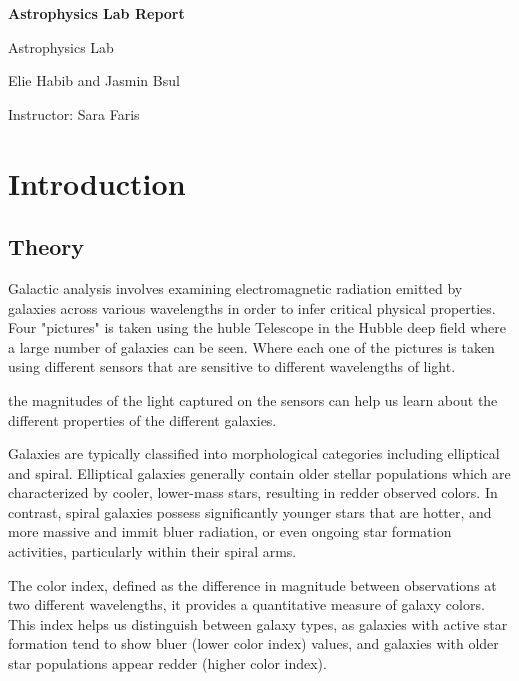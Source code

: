 \documentclass[11pt,a4paper]{article}
\newcommand{\reporttitle}{Astrophysics Lab Report}
\newcommand{\authorname}{Elie Habib and Jasmin Bsul}
\newcommand{\instructor}{Sara Faris}
\newcommand{\coursename}{Astrophysics Lab}
\begin{document}
\begin{titlepage}
  \centering
  \vspace*{1cm}
  {\Huge\bfseries \reporttitle \par}
  \vspace{1.5cm}
  {\Large\coursename \par}
  \vspace{2cm}
  {\Large\authorname \par}
  \vfill
  Instructor: \instructor\par
\end{titlepage}

\cleardoublepage
{}
\tableofcontents
\cleardoublepage
{}

\section{Introduction}
\subsection{Theory}
Galactic analysis involves examining electromagnetic radiation emitted by galaxies across various wavelengths in order to infer critical physical properties. 
Four "pictures" is taken using the huble Telescope in  the Hubble deep field where a large number of galaxies can be seen. Where each one of the pictures is taken using different sensors that are sensitive to different wavelengths of light. 

the magnitudes of the light captured on the sensors can help us learn about the different properties of the different galaxies. 


Galaxies are typically classified into morphological categories including elliptical and spiral. Elliptical galaxies generally contain older stellar populations which are characterized by cooler, lower-mass stars, resulting in redder observed colors. In contrast, spiral galaxies possess significantly younger stars that are hotter, and more massive and immit bluer radiation, or even ongoing star formation activities, particularly within their spiral arms.

The color index, defined as the difference in magnitude between observations at two different wavelengths,  it provides a quantitative measure of galaxy colors. This index helps us distinguish between galaxy types, as galaxies with active star formation tend to show bluer (lower color index) values, and galaxies with older star populations appear redder (higher color index).
\end{document}
